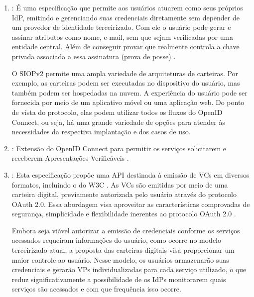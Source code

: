 \begin{enumerate}

    \item \textbf{}: É uma especificação que permite aos usuários atuarem como seus próprios \acs{IdP}, emitindo e gerenciando suas credenciais diretamente sem depender de um provedor de identidade terceirizado. Com ele o usuário pode gerar e assinar atributos como nome, e-mail, sem que sejam verificadas por uma entidade central. Além de conseguir provar que realmente controla a chave privada associada a essa assinatura (prova de posse) \cite{SIOPv2023}. 

    O \acs{SIOPv2} permite uma ampla variedade de arquiteturas de carteiras. Por exemplo, as carteiras podem ser executadas no dispositivo do usuário, mas também podem ser hospedadas na nuvem. A experiência do usuário pode ser fornecida por meio de um aplicativo móvel ou uma aplicação web. Do ponto de vista do protocolo, elas podem utilizar todos os fluxos do OpenID Connect, ou seja, há uma grande variedade de opções para atender às necessidades da respectiva implantação e dos casos de uso.
    
    \item \textbf{}: Extensão do OpenID Connect para permitir os serviços solicitarem e receberem Apresentações Verificáveis \cite{OIDC4VP2023}.
    
    \item \textbf{}: Esta especificação propõe uma API destinada à emissão de \acs{VC}s em diversos formatos, incluindo o do W3C \cite{data-model-w3c}. As \acs{VC}s são emitidas por meio de uma carteira digital, previamente autorizada pelo usuário através do protocolo OAuth 2.0. Essa abordagem visa aproveitar as características comprovadas de segurança, simplicidade e flexibilidade inerentes ao protocolo OAuth 2.0 \cite{OIDC4CI2023}.

    Embora seja viável autorizar a emissão de credenciais conforme os serviços acessados requeiram informações do usuário, como ocorre no modelo terceirizado atual, a proposta das carteiras digitais visa proporcionar um maior controle ao usuário. Nesse modelo, os usuários armazenarão suas credenciais e gerarão \acs{VP}s individualizadas para cada serviço utilizado, o que reduz significativamente a possibilidade de os \acs{IdP}s monitorarem quais serviços são acessados e com que frequência isso ocorre.
    
\end{enumerate}


